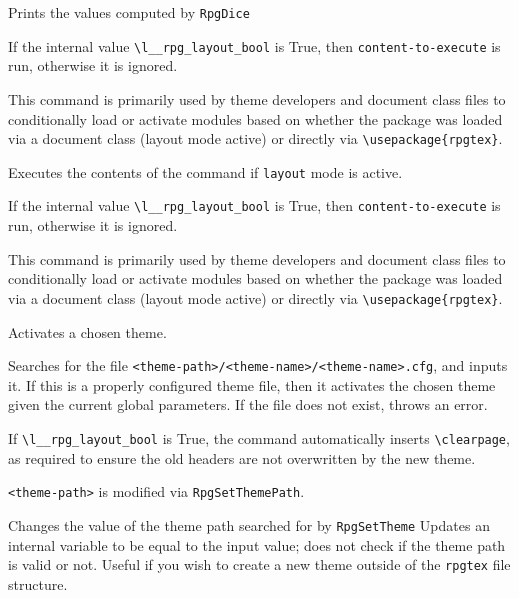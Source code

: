 		\begin{macrolist}
				{\label{Macro:DiceFormat}
					Prints the values computed by \verb|RpgDice| 
				}
				{
				}
				{
					If the internal value \texttt{\textbackslash{}l\_\_rpg\_layout\_bool} is True, then \verb|content-to-execute| is run, otherwise it is ignored.

					This command is primarily used by theme developers and document class files to conditionally load or activate modules based on whether the package was loaded via a document class (layout mode active) or directly via \verb|\usepackage{rpgtex}|.
				}
				{
					Executes the contents of the command if \verb|layout| mode is active.
				}
				{
				}
				{
					If the internal value \texttt{\textbackslash{}l\_\_rpg\_layout\_bool} is True, then \verb|content-to-execute| is run, otherwise it is ignored.

					This command is primarily used by theme developers and document class files to conditionally load or activate modules based on whether the package was loaded via a document class (layout mode active) or directly via \verb|\usepackage{rpgtex}|.
				}
				{
					Activates a chosen theme.
				}
				{
				}
				{
					Searches for the file \verb|<theme-path>/<theme-name>/<theme-name>.cfg|, and inputs it. If this is a properly configured theme file, then it activates the chosen theme given the current global parameters. If the file does not exist, throws an error.

					If   \texttt{\textbackslash{}l\_\_rpg\_layout\_bool} is True, the command automatically inserts \verb|\clearpage|, as required to ensure the old headers are not overwritten by the new theme.

					\verb|<theme-path>| is modified via \verb|RpgSetThemePath|.
				}

				{
					Changes the value of the theme path searched for by \verb|RpgSetTheme|
				}
				{
				}
				{
					Updates an internal variable to be equal to the input value; does not check if the theme path is valid or not. Useful if you wish to create a new theme outside of the \verb|rpgtex| file structure.
				}
		\end{macrolist}

